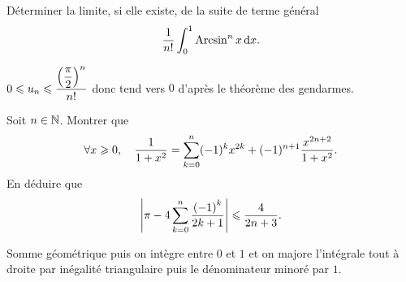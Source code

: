 \documentclass{magnolia}
\begin{document}
\begin{exos}
\exo[utile=2] Déterminer la limite, si elle existe, de la suite de terme général
  \[\frac{1}{n!}\int_{0}^{1} \operatorname{Arcsin}^n x\,\text{d}x.\]
  \begin{sol}$0\leqslant u_n\leqslant \dfrac{\left(\dfrac{\pi}{2}\right)^n}{n!}$ donc tend vers $0$ d'après le théorème des gendarmes.
  \end{sol}

\exo[utile=2] Soit $n\in\mathbb{N}$. Montrer que
  \[\forall x\geqslant 0 ,\quad \frac{1}{1+x^2}=\sum_{k=0}^n (-1)^k x^{2k} +(-1)^{n+1} \frac{x^{2n+2}}{1+x^2}.\]
  En déduire que
  \[\left|\pi-4\sum_{k=0}^n \frac{\left(-1\right)^k}{2k+1}\right|\leqslant\frac{4}{2n+3}.\]
  \begin{sol}
  Somme géométrique puis on intègre entre $0$ et $1$ et on majore l'intégrale tout à droite par inégalité triangulaire puis le dénominateur minoré par $1$.
  \end{sol}

\end{exos}
\end{document}
